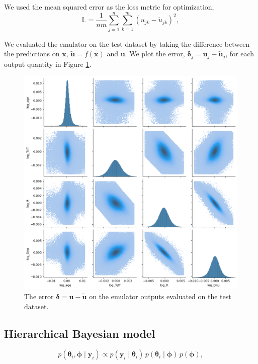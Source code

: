 \documentclass[fleqn,usenatbib]{mnras}
\renewcommand*{\vec}[1]{\boldsymbol{#1}}
\newcommand{\obs}{{\vec{y}}}
\newcommand{\inputs}{{\vec{x}}}
\newcommand{\outputs}{{\vec{u}}}
\newcommand{\pred}{{\tilde{\outputs}}}
\newcommand{\error}{{\vec{\delta}}}
\begin{document}
We used the mean squared error as the loss metric for optimization,
%
\begin{equation}
    \mathbb{L} = \frac{1}{nm} \sum_{j=1}^{n} \sum_{k=1}^{m} (u_{jk} - \tilde u_{jk})^2,
\end{equation} 

We evaluated the emulator on the test dataset by taking the difference between the predictions on \(\inputs\), \(\pred = f(\inputs)\) and \(\outputs\). We plot the error, \(\error_j = \outputs_j - \pred_j\), for each output quantity in Figure \ref{fig:error}.

\begin{figure}
    \centering
    \includegraphics[width=1.0\linewidth]{figures/error.png}
    \caption{The error \(\vec\error = \outputs - \pred\) on the emulator outputs evaluated on the test dataset.}
    \label{fig:error}
\end{figure}

\subsection{Hierarchical Bayesian model}
\label{sec:hbm}

%
\begin{equation}
    p(\vec \theta_i, \vec \phi \mid \obs_i) \propto p(\obs_i \mid \vec \theta_i) \, p(\vec\theta_i \mid \vec\phi) \, p(\vec\phi),
\end{equation}
%
\end{document}
